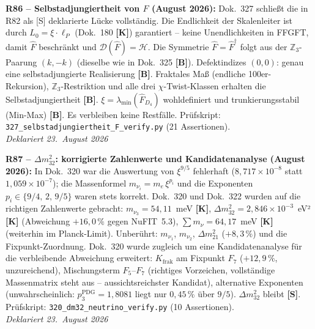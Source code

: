 \textbf{R86 -- Selbstadjungiertheit von $\hat{F}$ (August 2026):}
Dok.~327 schließt die in R82 als [S] deklarierte Lücke vollständig.
Die Endlichkeit der Skalenleiter ist durch $L_0 = \xi\cdot\ell_P$
(Dok.~180 \textbf{[K]}) garantiert -- keine Unendlichkeiten in FFGFT,
damit $\hat{F}$ beschränkt und $\mathcal{D}(\hat{F}) = \mathcal{H}$.
Die Symmetrie $\hat{F} = \hat{F}^\dagger$ folgt aus der $\mathbb{Z}_3$-Paarung
$(k,-k)$ (dieselbe wie in Dok.~325 \textbf{[B]}).
Defektindizes $(0,0)$: genau eine selbstadjungierte Realisierung \textbf{[B]}.
Fraktales Maß (endliche 100er-Rekursion), $\mathbb{Z}_3$-Restriktion
und alle drei $\chi$-Twist-Klassen erhalten die Selbstadjungiertheit \textbf{[B]}.
$\xi = \lambda_{\min}(\hat{F}_{D_4})$ wohldefiniert und trunkierungsstabil
(Min-Max) \textbf{[B]}.
Es verbleiben keine Restfälle.
Prüfskript: \texttt{327\_selbstadjungiertheit\_F\_verify.py} (21 Assertionen).\\
\emph{Deklariert 23.~August 2026}

\medskip

\textbf{R87 -- $\Delta m_{32}^2$: korrigierte Zahlenwerte und Kandidatenanalyse (August 2026):}
In Dok.~320 war die Auswertung von $\xi^{9/5}$ fehlerhaft ($8{,}717\times10^{-8}$ statt
$1{,}059\times10^{-7}$); die Massenformel $m_{\nu_i} = m_e\,\xi^{p_i}$ und die Exponenten
$p_i \in \{9/4,\,2,\,9/5\}$ waren stets korrekt. Dok.~320 und Dok.~322 wurden auf die
richtigen Zahlenwerte gebracht: $m_{\nu_3} = 54{,}11$~meV \textbf{[K]},
$\Delta m_{32}^2 = 2{,}846\times10^{-3}$~eV² \textbf{[K]} (Abweichung $+16{,}0\,\%$ gegen
NuFIT~5.3), $\sum m_\nu = 64{,}17$~meV \textbf{[K]} (weiterhin im Planck-Limit).
Unberührt: $m_{\nu_1}$, $m_{\nu_2}$, $\Delta m_{21}^2$ ($+8{,}3\,\%$) und die
Fixpunkt-Zuordnung. Dok.~320 wurde zugleich um eine Kandidatenanalyse für die
verbleibende Abweichung erweitert: $K_{\mathrm{frak}}$ am Fixpunkt $F_7$ ($+12{,}9\,\%$,
unzureichend), Mischungsterm $F_5$--$F_7$ (richtiges Vorzeichen, vollständige
Massenmatrix steht aus -- aussichtsreichster Kandidat), alternative Exponenten
(unwahrscheinlich: $p_3^{\mathrm{PDG}} = 1{,}8081$ liegt nur $0{,}45\,\%$ über $9/5$).
$\Delta m_{32}^2$ bleibt \textbf{[S]}.
Prüfskript: \texttt{320\_dm32\_neutrino\_verify.py} (10 Assertionen).\\
\emph{Deklariert 23.~August 2026}

\medskip

